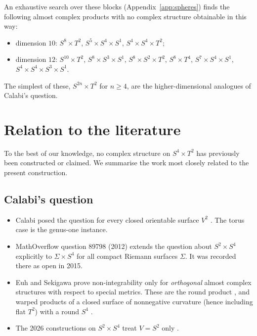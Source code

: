 \documentclass{article}
\theoremstyle{definition}
\theoremstyle{plain}
\begin{document}
An exhaustive search over these blocks (Appendix~\ref{app:spheres}) finds the following
almost complex products with no complex structure obtainable in this way:
\begin{itemize}
\item dimension $10$: $S^8\times T^2$, $S^5\times S^4\times S^1$, $S^4\times S^4\times T^2$;
\item dimension $12$: $S^{10}\times T^2$, $S^8\times S^3\times S^1$, $S^8\times S^2\times T^2$,
  $S^8\times T^4$, $S^7\times S^4\times S^1$, $S^4\times S^4\times S^3\times S^1$.
\end{itemize}
The simplest of these, $S^{2n}\times T^2$ for $n\ge4$, are the higher-dimensional analogues
of Calabi's question.

\section{Relation to the literature}\label{sec:literature}

To the best of our knowledge, no complex structure on $S^4\times T^2$ has previously
been constructed or claimed. We summarise the work most closely related to the
present construction.

\subsection*{Calabi's question}
\begin{itemize}
\item Calabi posed the question for every closed orientable surface $V^2$
  \cite[p.~408]{Calabi58}. The torus case is the genus-one instance.
\item MathOverflow question 89798 \cite{MO89798} (2012) extends the question about
  $S^2\times S^4$ explicitly to $\Sigma\times S^4$ for all compact Riemann surfaces
  $\Sigma$. It was recorded there as open in 2015.
\item Euh and Sekigawa prove non-integrability only for \emph{orthogonal} almost
  complex structures with respect to special metrics. These are the round product
  \cite{EuhSekigawa13}, and warped products of a closed surface of nonnegative
  curvature (hence including flat $T^2$) with a round $S^4$ \cite{EuhSekigawa16}.
\item The 2026 constructions on $S^2\times S^4$ treat $V=S^2$ only \cite{GFL26,LLZ26}.
\end{itemize}
\end{document}
